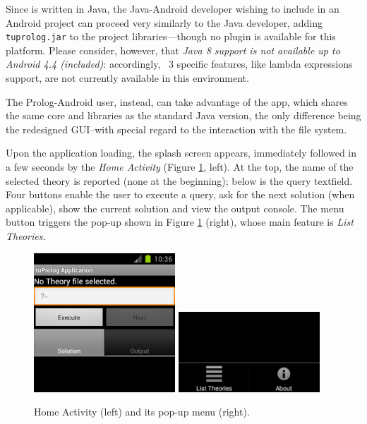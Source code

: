 Since \tuprolog{} is written in Java, the Java-Android developer wishing to include \tuprolog{} in an Android project can proceed very similarly to the Java developer, adding \texttt{tuprolog.jar} to the project libraries---though no plugin is available for this platform.
Please consider, however, that \textit{Java 8 support is not available up to Android 4.4 (included)}: accordingly, \tuprolog{}~3 specific features, like lambda expressions support, are not currently available in this environment.

The Prolog-Android user, instead, can take advantage of the \tuprolog{} app, which shares the same core and libraries as the standard Java version, the only difference being the redesigned GUI--with special regard to the interaction with the file system.

Upon the application loading, the splash screen appears, immediately followed in a few seconds by the \textit{Home Activity} (Figure \ref{fig:android1e2}, left).
%
At the top, the name of the selected theory is reported (none at the beginning); below is the query textfield.
%
Four buttons enable the user to execute a query, ask for the next solution (when applicable), show the current solution and view the output console.
%
The menu button triggers the pop-up shown in Figure \ref{fig:android1e2} (right), whose main feature is \textit{List Theories}.

\begin{figure}
\centering
  \includegraphics[width=200px]{images/android1.png}
  \includegraphics[width=200px]{images/android2.png}
  \caption{Home Activity (left) and its pop-up menu (right).}\label{fig:android1e2}
\end{figure}

